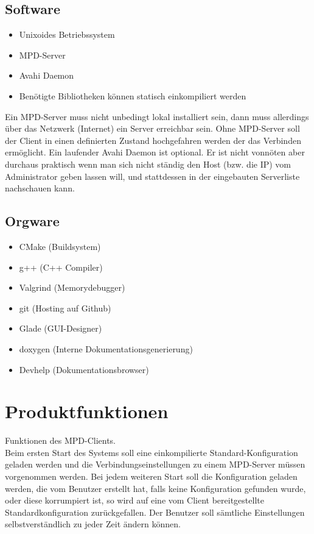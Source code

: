 \subsection{Software}
\begin{itemize}
	\item Unixoides Betriebssystem
	\item MPD-Server 
	\item Avahi Daemon
	\item Benötigte Bibliotheken können statisch einkompiliert werden
\end{itemize}
Ein MPD-Server muss nicht unbedingt lokal installiert sein, dann muss 
allerdings über das Netzwerk (Internet) ein Server erreichbar sein.
Ohne MPD-Server soll der Client in einen definierten Zustand hochgefahren werden der das Verbinden ermöglicht.
Ein laufender Avahi Daemon ist optional. Er ist nicht vonnöten aber durchaus praktisch wenn man sich nicht ständig den Host (bzw. die IP) 
vom Administrator geben lassen will, und stattdessen in der eingebauten Serverliste nachschauen kann.

\subsection{Orgware}
\begin{itemize}
	\item CMake (Buildsystem)
	\item g++ (C++ Compiler)
	\item Valgrind (Memorydebugger)
	\item git (Hosting auf Github) 
	\item Glade (GUI-Designer)
	\item doxygen  (Interne Dokumentationsgenerierung)
	\item Devhelp (Dokumentationsbrowser)
\end{itemize}

\section{Produktfunktionen}
Funktionen des MPD-Clients.\ \\
Beim ersten Start des Systems soll eine einkompilierte Standard-Konfiguration geladen werden und die Verbindungseinstellungen
zu einem MPD-Server müssen vorgenommen werden. Bei jedem weiteren Start soll die Konfiguration geladen werden,
die vom Benutzer erstellt hat,  falls keine Konfiguration gefunden wurde, oder diese korrumpiert ist,
so wird auf eine vom Client bereitgestellte Standardkonfiguration zurückgefallen. Der Benutzer soll sämtliche
Einstellungen selbstverständlich zu jeder Zeit ändern können.
\newpage
